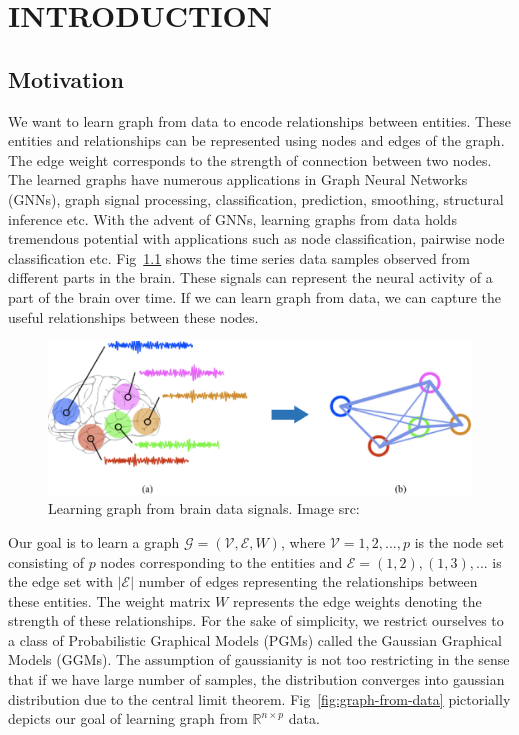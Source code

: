 \chapter{INTRODUCTION}
\label{chap:intro}



\section{Motivation}

We want to learn graph from data to encode relationships between entities. These entities and relationships can be represented using nodes and edges of the graph. The edge weight corresponds to the strength of connection between two nodes. The learned graphs have numerous applications in Graph Neural Networks (GNNs), graph signal processing, classification, prediction, smoothing, structural inference etc. With the advent of GNNs, learning graphs from data holds tremendous potential with applications such as node classification, pairwise node classification etc. Fig~\ref{fig:graph-from-brain-data} shows the time series data samples observed from different parts in the brain. These signals can represent the neural activity of a part of the brain over time. If we can learn graph from data, we can capture the useful relationships between these nodes.

\begin{center}
	\begin{figure}[htpb]
		\includegraphics[scale=0.45]{Pictures/dong.eps}
		\caption{Learning graph from brain data signals. Image src: \cite{dong2019learning}  }
		\label{fig:graph-from-brain-data}
	\end{figure}
\end{center}

Our goal is to learn a graph $\mathcal{G} = (\mathcal{V}, \mathcal{E}, W)$, where $\mathcal{V} = {1, 2, ..., p}$ is the node set consisting of $p$ nodes corresponding to the entities and $\mathcal{E}={(1,2), (1,3), ...}$ is the edge set with $|\mathcal{E}|$ number of edges representing the relationships between these entities. The weight matrix $W$ represents the edge weights denoting the strength of these relationships. For the sake of simplicity, we restrict ourselves to a class of Probabilistic Graphical Models (PGMs) called the Gaussian Graphical Models (GGMs). The assumption of gaussianity is not too restricting in the sense that if we have large number of samples, the distribution converges into gaussian distribution due to the central limit theorem. Fig~\ref{fig:graph-from-data} pictorially depicts our goal of learning graph from $\mathbb{R}^{n \times p} $ data.

